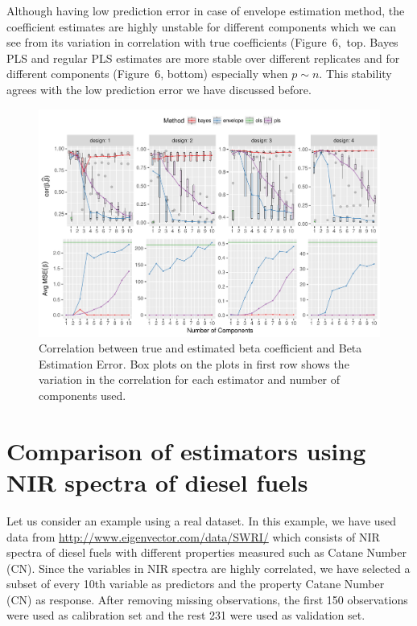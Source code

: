 \documentclass[num-refs]{wiley-article}
\begin{document}
Although having low prediction error in case of envelope estimation method, the coefficient estimates are highly unstable for different components which we can see from its variation in correlation with true coefficients (Figure~6,~top. Bayes PLS and regular PLS estimates are more stable over different replicates and for different components (Figure~6, bottom) especially when $p\sim n$. This stability agrees with the low prediction error we have discussed before.


\begin{figure}[!ht]
  \centering
  \includegraphics[width=\textwidth]{est-combined-plot.pdf}
  \caption{Correlation between true and estimated beta coefficient and Beta
    Estimation Error. Box plots on the plots in first row shows the variation in
  the correlation for each estimator and number of components used.}
  \label{fig:est-error-combined}
\end{figure}

\section{Comparison of estimators using NIR spectra of diesel fuels}

Let us consider an example using a real dataset. In this example, we have used data from \url{http://www.eigenvector.com/data/SWRI/} which consists of NIR spectra of diesel fuels with different properties measured such as Catane Number (CN). Since the variables in NIR spectra are highly correlated, we have selected a subset of every 10th variable as predictors and the property Catane Number (CN) as response. After removing missing observations, the first 150 observations were used as calibration set and the rest 231 were used as validation set.
\end{document}

